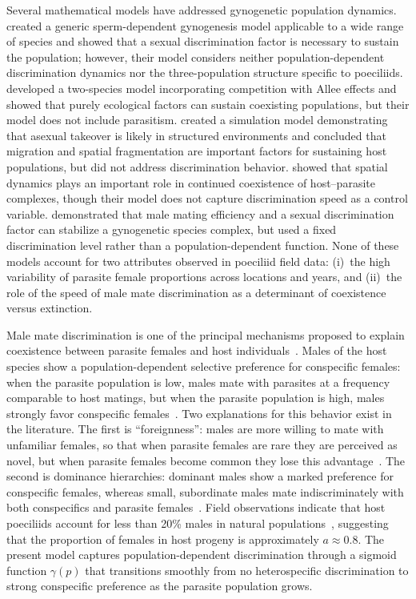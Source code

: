 \documentclass[12pt]{article}
\begin{document}
Several mathematical models have addressed gynogenetic population dynamics.  \citet{Kiester1981} created a generic sperm-dependent gynogenesis model applicable to a wide range of species and showed that a sexual discrimination factor is necessary to sustain the population; however, their model considers neither population-dependent discrimination dynamics nor the three-population structure specific to poeciliids.  \citet{Schley2004} developed a two-species model incorporating competition with Allee effects and showed that purely ecological factors can sustain coexisting populations, but their model does not include parasitism.  \citet{Peck1999} created a simulation model demonstrating that asexual takeover is likely in structured environments and concluded that migration and spatial fragmentation are important factors for sustaining host populations, but did not address discrimination behavior.  \citet{Kokko2008} showed that spatial dynamics plays an important role in continued coexistence of host--parasite complexes, though their model does not capture discrimination speed as a control variable.  \citet{Heubel2009} demonstrated that male mating efficiency and a sexual discrimination factor can stabilize a gynogenetic species complex, but used a fixed discrimination level rather than a population-dependent function.  None of these models account for two attributes observed in poeciliid field data: (i)~the high variability of parasite female proportions across locations and years, and (ii)~the role of the speed of male mate discrimination as a determinant of coexistence versus extinction.

Male mate discrimination is one of the principal mechanisms proposed to explain coexistence between parasite females and host individuals~\citep{Kokko2008, Balsano1989, Kiester1981, Heubel2009}.  Males of the host species show a population-dependent selective preference for conspecific females: when the parasite population is low, males mate with parasites at a frequency comparable to host matings, but when the parasite population is high, males strongly favor conspecific females~\citep{Riesch2008}.  Two explanations for this behavior exist in the literature.  The first is ``foreignness'': males are more willing to mate with unfamiliar females, so that when parasite females are rare they are perceived as novel, but when parasite females become common they lose this advantage~\citep{Balsano1989}.  The second is dominance hierarchies: dominant males show a marked preference for conspecific females, whereas small, subordinate males mate indiscriminately with both conspecifics and parasite females~\citep{Balsano1989}.  Field observations indicate that host poeciliids account for less than 20\% males in natural populations~\citep{Balsano1989, Snelson1980}, suggesting that the proportion of females in host progeny is approximately $a \approx 0.8$.  The present model captures population-dependent discrimination through a sigmoid function $\gamma(p)$ that transitions smoothly from no heterospecific discrimination to strong conspecific preference as the parasite population grows.
\end{document}
